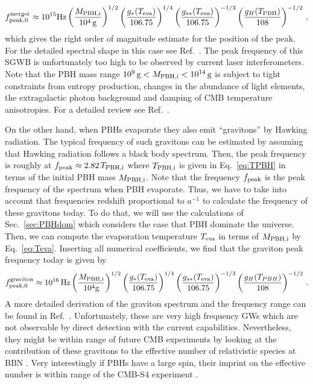 \documentclass[a4paper,11pt]{article}
\numberwithin{equation}{section}
\begin{document}
\begin{align}
f^{\rm merger}_{\rm peak,0}\approx 10^{15}{\rm Hz}\left(\frac{M_{\rm PBH,i}}{10^{4}\,{\rm g}}\right)^{1/2}\left(\frac{g_*(T_{\rm eva})}{106.75}\right)^{1/4}\left(\frac{g_{s*}(T_{\rm eva})}{106.75}\right)^{-1/3} \left(\frac{g_H(T_{\rm PBH})}{108}\right)^{-1/2}\,,
\end{align}
which gives the right order of magnitude estimate for the position of the peak. For the detailed spectral shape in this case see Ref.~\cite{Inomata:2020lmk}. The peak frequency of this SGWB is unfortunately too high to be observed by current laser interferometers. Note that the PBH mass range $10^{9}\,{\rm g}<M_{\rm PBH,i}<10^{14}\,{\rm g}$ is subject to tight constraints from entropy production, changes in the abundance of light elements, the extragalactic photon background and damping of CMB temperature anisotropies. For a detailed review see Ref.~\cite{Carr:2020gox}.

On the other hand, when PBHs evaporate they also emit ``gravitons'' by Hawking radiation. The typical frequency of such gravitons can be estimated by assuming that Hawking radiation follows a black body spectrum. Then, the peak frequency is roughly at $f_{\rm peak}\approx 2.82\, T_{\rm PBH,i}$ where $T_{\rm PBH,i}$ is given in Eq.~\eqref{eq:TPBH} in terms of the initial PBH mass $M_{\rm PBH,i}$. Note that the frequency $f_{\rm peak}$ is the peak frequency of the spectrum when PBH evaporate. Thus, we have to take into account that frequencies redshift proportional to $a^{-1}$ to calculate the frequency of these gravitons today. To do that, we will use the calculations of Sec.~\ref{sec:PBHdom} which considers the case that PBH dominate the universe. Then, we can compute the evaporation temperature $T_{\rm eva}$ in terms of $M_{\rm PBH,i}$ by Eq.~\eqref{eq:Teva}. Inserting all numerical coefficients, we find that the graviton peak frequency today is given by
\begin{align}
f^{\rm graviton}_{\rm peak,0}\approx 10^{16}\,{\rm Hz}\left(\frac{M_{\rm PBH,i}}{10^4 {\rm g}}\right)^{1/2}\left(\frac{g_*(T_{\rm eva})}{106.75}\right)^{1/4}\left(\frac{g_{s*}(T_{\rm eva})}{106.75}\right)^{-1/3} \left(\frac{g_H(T_{PBH})}{108}\right)^{-1/2}\,.
\end{align}
A more detailed derivation of the graviton spectrum and the frequency range can be found in Ref.~\cite{Inomata:2020lmk}. Unfortunately, these are very high frequency GWs which are not observable by direct detection with the current capabilities. Nevertheless, they might be within range of future CMB experiments by looking at the contribution of these gravitons to the effective number of relativistic species at BBN \cite{Dong:2015yjs,Arbey:2019jmj,Kuhnel:2019zbc,Arbey:2021ysg,Masina:2021zpu}. Very interestingly if PBHs have a large spin, their imprint on the effective number is within range of the CMB-S4 experiment \cite{Arbey:2021ysg,Masina:2021zpu}. 
\end{document}
